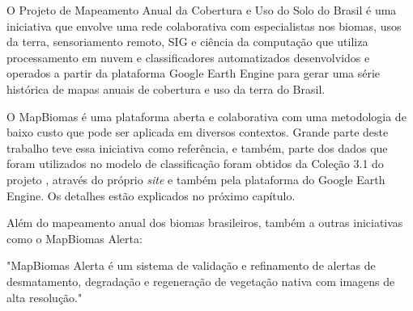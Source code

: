 \begin{citacao}
O Projeto de Mapeamento Anual da Cobertura e Uso do Solo do Brasil é uma
iniciativa que envolve uma rede colaborativa com especialistas nos
biomas, usos da terra, sensoriamento remoto, SIG e ciência da computação
que utiliza processamento em nuvem e classificadores automatizados
desenvolvidos e operados a partir da plataforma Google Earth Engine para
gerar uma série histórica de mapas anuais de cobertura e uso da terra do
Brasil. \cite{mapbiomas2018coleccao}
\end{citacao} 

O MapBiomas é uma plataforma aberta e colaborativa com uma metodologia
de baixo custo que pode ser aplicada em diversos contextos. Grande parte
deste trabalho teve essa iniciativa como referência, e também, parte dos
dados que foram utilizados no modelo de classificação foram obtidos da
Coleção 3.1 do projeto \cite{mapbiomas2018coleccao}, através do próprio \emph{site} e também pela
plataforma do Google Earth Engine. Os detalhes estão explicados no próximo capítulo.

Além do mapeamento anual dos biomas brasileiros, também a outras
iniciativas como o MapBiomas Alerta:

\begin{citacao}
"MapBiomas Alerta é um sistema de validação e refinamento de alertas de
desmatamento, degradação e regeneração de vegetação nativa com imagens
de alta resolução." \cite{mapbiomas2018coleccao}
\end{citacao}







